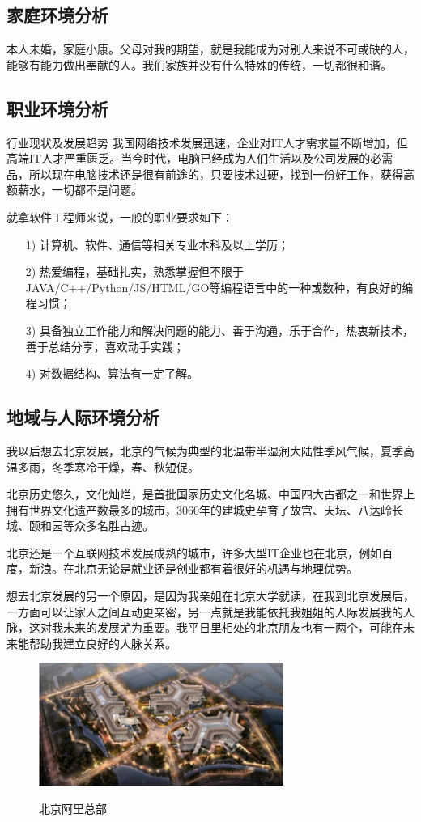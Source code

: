 \documentclass{article}
\begin{document}
\subsection{家庭环境分析}
本人未婚，家庭小康。父母对我的期望，就是我能成为对别人来说不可或缺的人，能够有能力做出奉献的人。我们家族并没有什么特殊的传统，一切都很和谐。\par
\subsection{职业环境分析}
行业现状及发展趋势 我国网络技术发展迅速，企业对IT人才需求量不断增加，但高端IT人才严重匮乏。当今时代，电脑已经成为人们生活以及公司发展的必需品，所以现在电脑技术还是很有前途的，只要技术过硬，找到一份好工作，获得高额薪水，一切都不是问题。\par
就拿软件工程师来说，一般的职业要求如下：
\begin{itemize} 
	\item [1) ]计算机、软件、通信等相关专业本科及以上学历；

 	\item [2)]热爱编程，基础扎实，熟悉掌握但不限于JAVA/C++/Python/JS/HTML/GO等编程语言中的一种或数种，有良好的编程习惯；
	\item [3) ]具备独立工作能力和解决问题的能力、善于沟通，乐于合作，热衷新技术，善于总结分享，喜欢动手实践；   
	\item [4) ]对数据结构、算法有一定了解。
\end{itemize}
	
\par


\subsection{地域与人际环境分析}
我以后想去北京发展，北京的气候为典型的北温带半湿润大陆性季风气候，夏季高温多雨，冬季寒冷干燥，春、秋短促。\par
北京历史悠久，文化灿烂，是首批国家历史文化名城、中国四大古都之一和世界上拥有世界文化遗产数最多的城市，3060年的建城史孕育了故宫、天坛、八达岭长城、颐和园等众多名胜古迹。\par
北京还是一个互联网技术发展成熟的城市，许多大型IT企业也在北京，例如百度，新浪。在北京无论是就业还是创业都有着很好的机遇与地理优势。\par
想去北京发展的另一个原因，是因为我亲姐在北京大学就读，在我到北京发展后，一方面可以让家人之间互动更亲密，另一点就是我能依托我姐姐的人际发展我的人脉，这对我未来的发展尤为重要。我平日里相处的北京朋友也有一两个，可能在未来能帮助我建立良好的人脉关系。
\par
    \begin{figure}[H]
    	\centering
    	\includegraphics[width=8cm]{1.png}
    	\label{figupc}
    	  \caption{北京阿里总部} 
    \end{figure}
\end{document}
